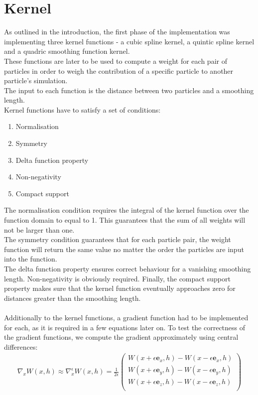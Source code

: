 \documentclass{ACGSeminar}
\begin{document}
\section{Kernel}

As outlined in the introduction, the first phase of the implementation was implementing three kernel functions - a cubic spline kernel, a quintic spline kernel and a quadric smoothing function kernel. \\
These functions are later to be used to compute a weight for each pair of particles in order to weigh the contribution of a specific particle to another particle's simulation. \\
The input to each function is the distance between two particles and a smoothing length. \\
Kernel functions have to satisfy a set of conditions: \\
\begin{enumerate}
\item Normalisation
\item Symmetry
\item Delta function property
\item Non-negativity
\item Compact support
\end{enumerate}
The normalisation condition requires the integral of the kernel function over the function domain to equal to 1. This guarantees that the sum of all weights will not be larger than one. \\
The symmetry condition guarantees that for each particle pair, the weight function will return the same value no matter the order the particles are input into the function.\\
The delta function property ensures correct behaviour for a vanishing smoothing length.
Non-negativity is obviously required.
Finally, the compact support property makes sure that the kernel function eventually approaches zero for distances greater than the smoothing length.\\
\\
Additionally to the kernel functions, a gradient function had to be implemented for each, as it is required in a few equations later on.
To test the correctness of the gradient functions, we compute the gradient approximately using central differences:\\
\begin{equation} 
\begin{aligned}
\nabla_{x}W(x, h) \approx \nabla^{\epsilon}_{x} W(x, h) = \frac{1}{2\epsilon}\begin{pmatrix}
W(x + \epsilon\mathbf{e}_{x}, h) - W(x - \epsilon\mathbf{e}_{x}, h)\\ 
W(x + \epsilon\mathbf{e}_{y}, h) - W(x - \epsilon\mathbf{e}_{y}, h)\\ 
W(x + \epsilon\mathbf{e}_{z}, h) - W(x - \epsilon\mathbf{e}_{z}, h)\\ 
\end{pmatrix}
\end{aligned}
\end{equation}
\end{document}
